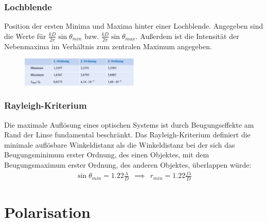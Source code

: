 \documentclass[twocolumn, unnumberedsubsub]{summery}
\begin{document}
\subsubsection{Lochblende}
Position der ersten Minima und Maxima hinter einer Lochblende. 
Angegeben sind die Werte für $\frac{k D}{2\pi} \sin \theta_{min}$ bzw. 
$\frac{k D}{2\pi} \sin \theta_{max}$. 
Au{\ss}erdem ist die Intensität der Nebenmaxima im Verhältnis zum zentralen
Maximum angegeben.
\begin{figure}[H]
    \centering
    \includegraphics[width=0.5\textwidth]{2.png}
\end{figure}

\subsubsection{Rayleigh-Kriterium}
Die maximale Auflösung eines optischen Systems ist durch Beugungseffekte am 
Rand der Linse fundamental beschränkt. 
Das Rayleigh-Kriterium definiert die minimale auflösbare Winkeldistanz
als die Winkeldistanz bei der 
sich das Beugungsminimum erster Ordnung, des einen Objektes, mit dem
Beugungsmaximum erster Ordnung, des anderen Objektes, überlappen würde:
\begin{align*}
    \sin\theta_{min} =  1.22 \frac{\lambda}{D}
    \ \ \implies \ \ r_{min} =  1.22 \frac{f \lambda}{D}
\end{align*}

\section{Polarisation}
\end{document}
